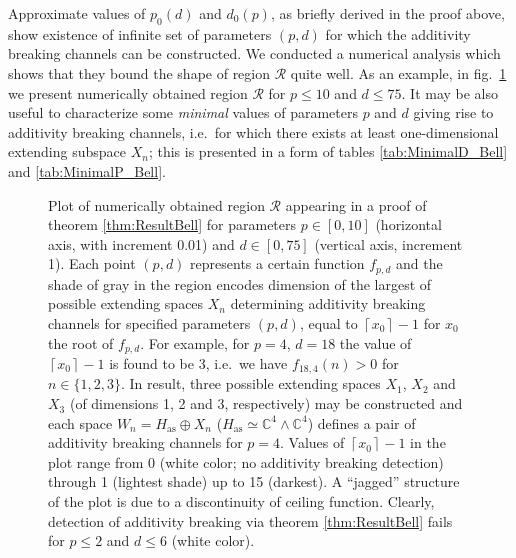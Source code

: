 \documentclass[reqno]{amsart}
\theoremstyle{plain}
\theoremstyle{note}
\newcommand{\ceil}[1]{\left\lceil #1 \right\rceil}
\newcommand{\aspace}{H_{\mathrm{as}}}
\newcommand{\complexes}{\mathbb{C}}
\begin{document}
Approximate values of $p_0 (d)$ and $d_0 (p)$, as briefly derived in the proof above, show existence of infinite set of parameters $(p,d)$ for which the additivity breaking channels can be constructed. We conducted a numerical analysis which shows that they bound the shape of region $\mathcal{R}$ quite well. As an example, in fig.~\ref{fig:RegionRBell} we present numerically obtained region $\mathcal{R}$ for $p\leqslant 10$ and $d \leqslant 75$. It may be also useful to characterize some \emph{minimal} values of parameters $p$ and $d$ giving rise to additivity breaking channels, i.e.~for which there exists at least one-dimensional extending subspace $X_n$; this is presented in a form of tables \ref{tab:MinimalD_Bell} and \ref{tab:MinimalP_Bell}.

\begin{figure}[ht]
    \centering
    \caption{Plot of numerically obtained region $\mathcal{R}$ appearing in a proof of theorem \ref{thm:ResultBell} for parameters $p\in [0,10]$ (horizontal axis, with increment 0.01) and $d \in [0,75]$ (vertical axis, increment 1). Each point $(p,d)$ represents a certain function $f_{p,d}$ and the shade of gray in the region encodes dimension of the largest of possible extending spaces $X_n$ determining additivity breaking channels for specified parameters $(p,d)$, equal to $\ceil{x_0}-1$ for $x_0$ the root of $f_{p,d}$. For example, for $p=4$, $d=18$ the value of $\ceil{x_0}-1$ is found to be 3, i.e.~we have $f_{18,4}(n) > 0$ for $n \in \{1,2,3\}$. In result, three possible extending spaces $X_1$, $X_2$ and $X_3$ (of dimensions 1, 2 and 3, respectively) may be constructed and each space $W_n = \aspace \oplus X_n$ ($\aspace \simeq \complexes^4 \wedge \complexes^4$) defines a pair of additivity breaking channels for $p=4$. Values of $\ceil{x_0}-1$ in the plot range from 0 (white color; no additivity breaking detection) through 1 (lightest shade) up to 15 (darkest). A ``jagged'' structure of the plot is due to a discontinuity of ceiling function. Clearly, detection of additivity breaking via theorem \ref{thm:ResultBell} fails for $p \leqslant 2$ and $d\leqslant 6$ (white color).}
    \label{fig:RegionRBell}
\end{figure}
\end{document}
